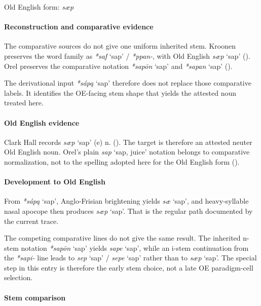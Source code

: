\documentclass[
  british,
  a4paper,
]{article}
\providecommand{\Recon}[1]{\emph{*#1}}
\begin{document}
Old English form: \emph{sæp}

\paragraph{Reconstruction and comparative
evidence}\label{reconstruction-and-comparative-evidence-101}

The comparative sources do not give one uniform inherited stem. Kroonen
preserves the word family as \Recon{saf} `sap' / \emph{*ppan-}, with Old
English \emph{sæp} `sap' (). Orel preserves the comparative notation \Recon{sapōn} `sap' and
\Recon{sapan} `sap' ().

The derivational input \Recon{sápą} `sap' therefore does not replace
those comparative labels. It identifies the OE-facing stem shape that
yields the attested noun treated here.

\paragraph{Old English evidence}\label{old-english-evidence-101}

Clark Hall records {\emph{sæp}} `sap' (e) n.
(). The target is
therefore an attested neuter Old English noun. Orel's plain {\emph{sap}}
`sap, juice' notation belongs to comparative normalization, not to the
spelling adopted here for the Old English form
().

\paragraph{Development to Old
English}\label{development-to-old-english-101}

From \Recon{sápą} `sap', Anglo-Frisian brightening yields \emph{sæ}
`sap', and heavy-syllable nasal apocope then produces {\emph{sæp}}
`sap'. That is the regular path documented by the current trace.

The competing comparative lines do not give the same result. The
inherited n-stem notation \Recon{sapōn} `sap' yields {\emph{sape}}
`sap', while an i-stem continuation from the {\emph{*sapi-}} line leads
to {\emph{sep}} `sap' / {\emph{sepe}} `sap' rather than to {\emph{sæp}}
`sap'. The special step in this entry is therefore the early stem
choice, not a late OE paradigm-cell selection.

\paragraph{Stem comparison}\label{stem-comparison-5}
\end{document}
